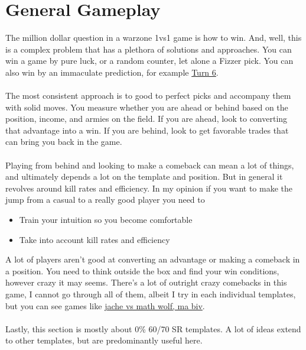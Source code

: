 \section{General Gameplay}

The million dollar question in a warzone 1vs1 game is how to win. And, well, this is a complex problem that has a plethora of solutions and approaches. You can win a game by pure luck, or a random counter, let alone a Fizzer pick. You can also win by an immaculate prediction, for example \href{https://www.warzone.com/MultiPlayer?GameID=29253462}{Turn 6}. 
\\
\\
The most consistent approach is to good to perfect picks and accompany them with solid moves. You measure whether you are ahead or behind based on the position, income, and armies on the field. If you are ahead, look to converting that advantage into a win. If you are behind, look to get favorable trades that can bring you back in the game. 
\\
\\
Playing from behind and looking to make a comeback can mean a lot of things, and ultimately depends a lot on the template and position. But in general it revolves around kill rates and efficiency. In my opinion if you want to make the jump from a casual to a really good player you need to 
\begin{itemize}
    \item Train your intuition so you become comfortable
    \item Take into account kill rates and efficiency
\end{itemize}

A lot of players aren't good at converting an advantage or making a comeback in a position. You need to think outside the box and find your win conditions, however crazy it may seems. There's a lot of outright crazy comebacks in this game, I cannot go through all of them, albeit I try in each individual templates, but you can see games like \href{https://www.warzone.com/MultiPlayer?GameID=36854272}{jache vs math wolf, ma biv}.
\\
\\
Lastly, this section is mostly about 0\% 60/70 SR templates. A lot of ideas extend to other templates, but are predominantly useful here.



